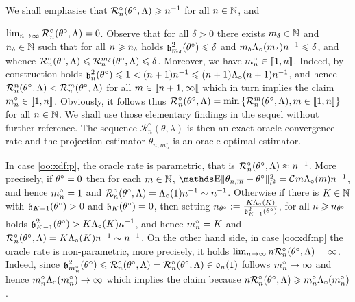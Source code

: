 \begin{rmk}\label{RMK_INTRO_FREQ_DECISION_ORACLEOPT_OPTPROJ}\label{oo:rem:ora}
We shall emphasise that $\oRa{\xdf,\Lambda}\geq \ssY^{-1}$ for all
  $\ssY\in\Nz$, and
  
  $\lim_{n \rightarrow \infty} \oRa{\xdf,\Lambda}=0$.
  Observe that for all $\delta>0$ there exists $\Di_{\delta}\in\Nz$ and
  $\ssY_\delta\in\Nz$ such that for all $\ssY\geq \ssY_{\delta}$ holds
  $\bias[\Di_\delta]^2(\xdf)\leq \delta$ and
  $\Di_{\delta} \oiSv[\Di_\delta] \ssY^{-1}\leq\delta$, and whence
  $\oRa{\xdf,\Lambda}\leq\dRa{\Di_\delta}{\xdf,\Lambda}\leq \delta$.
  Moreover, we have $\oDi{\ssY}\in\nset{1,\ssY}$. Indeed, by construction
  holds
  $\bias[\ssY]^2(\xdf)\leq 1<(\ssY+1)\ssY^{-1}\leq
  (\ssY+1)\oiSv[\ssY+1]{}\ssY^{-1}$, and hence
  $\dRa{\ssY}{\xdf,\Lambda}<\dRa{\Di}{\xdf,\Lambda}$ for all
  $\Di\in \nsetro{\ssY+1,\infty}$ which in turn implies the claim
  $\oDi{\ssY}\in\nset{1,\ssY}$. Obviously, it follows thus
  $\oRa{\xdf,\Lambda}=\min\set{ \dRa{\Di}{\xdf,\Lambda}
    ,\Di\in\nset{1,\ssY}}$ for all $\ssY\in\Nz$. We shall use those
  elementary findings in the sequel without further reference.
The sequence $\mathcal{R}_{n}^{\circ}(\theta, \lambda)$ is then an exact oracle convergence rate and the projection estimator $\theta_{n, \overline{m_{n}^{\circ}}}$ is an oracle optimal estimator.
\remEnd
\end{rmk}

\begin{rmk}\label{ge:oo:rem:ora2}
In case \ref{oo:xdf:p}, the oracle rate is parametric, that is
$\oRa{\xdf, \Lambda} \approx \ssY^{-1}$. More precisely, if $\xdf=0$ then
for each  $\Di\in\Nz$,
$\E\Vnormlp{\txdfPr-\xdf}^2=\cst{}\Di\oiSv[\Di]\ssY^{-1}$,
and hence $\oDi{\ssY}=1$ and $\oRa{\xdf, \Lambda}=\oiSv[1]\ssY^{-1}\sim\ssY^{-1}$. Otherwise
if there is $K\in\Nz$  with $\bias[K-1](\xdf)>0$ and
$\bias[K](\xdf)=0$, then setting
$\ssY_{\xdf}:=\tfrac{K\oiSv[K]}{\bias[K-1]^2(\xdf)}$, for all
$\ssY\geq \ssY_{\xdf}$ holds
$\bias[K-1]^2(\xdf)>K\oiSv[K]\ssY^{-1}$, and hence  $\oDi{\ssY}=K$ and
$\oRa{\xdf,\Lambda}= K\oiSv[K]\ssY^{-1}\sim \ssY^{-1}$.
On the other hand side, in case \ref{oo:xdf:np} the oracle rate is
non-parametric, more precisely, it holds
$\lim_{\ssY\to\infty}\ssY\oRa{\xdf,\Lambda}=\infty$. Indeed, since
$\bias[\oDi{\ssY}]^2(\xdf)\leq\oRa{\xdf,\Lambda}=\oRa{\xdf,\Lambda}\in\mathfrak{o}_{n}(1)$ follows $\oDi{\ssY}\to\infty$ and hence
$\oDi{\ssY}\oiSv[\oDi{\ssY}]\to\infty$ which implies the claim because
$\ssY\oRa{\xdf,\Lambda}\geq\oDi{\ssY}\oiSv[\oDi{\ssY}]$.
\end{rmk}

